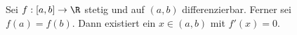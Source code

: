 Sei $f: [a, b] \to \R$ stetig und auf $(a, b)$ differenzierbar. Ferner sei $f(a) = f(b)$. Dann existiert ein $x \in (a, b)$ mit $f'(x) = 0$.